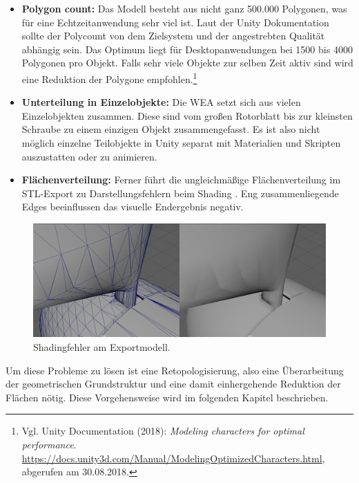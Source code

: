 \begin{itemize}
\item \textbf{Polygon count:} Das Modell besteht aus nicht ganz 500.000 Polygonen, was für eine Echtzeitanwendung sehr viel ist. Laut der Unity Dokumentation sollte der Polycount von dem Zielsystem und der angestrebten Qualität abhängig sein. Das Optimum liegt für Desktopanwendungen bei 1500 bis 4000 Polygonen pro Objekt. Falls sehr viele Objekte zur selben Zeit aktiv sind wird eine Reduktion der Polygone empfohlen.\footnote{Vgl. Unity Documentation  (2018): \textit{Modeling characters for optimal performance}.\newline
\url{https://docs.unity3d.com/Manual/ModelingOptimizedCharacters.html},\newline 
abgerufen am 30.08.2018.}     

\item \textbf{Unterteilung in Einzelobjekte:} Die WEA setzt sich aus vielen Einzelobjekten zusammen. Diese sind vom großen Rotorblatt bis zur kleinsten Schraube zu einem einzigen Objekt zusammengefasst. Es ist also nicht möglich einzelne Teilobjekte in Unity separat mit Materialien und Skripten auszustatten oder zu animieren.  

\item \textbf{Flächenverteilung:} Ferner führt die ungleichmäßige Flächenverteilung im STL-Export zu Darstellungsfehlern beim Shading . Eng zusammenliegende Edges beeinflussen das visuelle Endergebnis negativ.
\end{itemize}

\begin{figure}[H]
	\centering
	\captionsetup{width=1\textwidth}
	\includegraphics[keepaspectratio, width=1\textwidth]{bildquellen/WEAfehlerhaftesshading}
	\caption{Shadingfehler am Exportmodell.}
	\label{fig:2.3}
\end{figure}

Um diese Probleme zu lösen ist eine Retopologisierung, also eine Überarbeitung der geometrischen Grundstruktur und eine damit einhergehende Reduktion der Flächen nötig. Diese Vorgehensweise wird im folgenden Kapitel  beschrieben.

